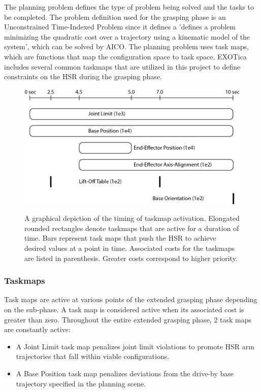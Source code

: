 \documentclass[12pt]{article}
\begin{document}
            \par The planning problem defines the type of problem being solved and the tasks to be completed. The problem definition used for the grasping phase is an Unconstrained Time-Indexed Problem since it defines a 'defines a problem minimizing the quadratic cost over a trajectory using a kinematic model of the system', which can be solved by AICO. The planning problem uses task maps, which are functions that map the configuration space to task space. EXOTica includes several common taskmaps that are utilized in this project to define constraints on the HSR during the grasping phase.
            
            \begin{figure}[ht]
                \centering
                \includegraphics[]{illustrator/taskmap.png}
                \label{fig:taskmap}
                \caption{A graphical depiction of the timing of taskmap activation. Elongated rounded rectangles denote taskmaps that are active for a duration of time. Bars represent task maps that push the HSR to achieve desired values at a point in time. Associated costs for the taskmaps are listed in parenthesis. Greater costs correspond to higher priority.}
            \end{figure}

            \subsubsection{Taskmaps}
                Task maps are active at various points of the extended grasping phase depending on the sub-phase. A task map is considered active when its associated cost is greater than zero. Throughout the entire extended grasping phase, 2 task maps are constantly active:
                \begin{itemize}
                    \item A Joint Limit task map penalizes joint limit violations to promote HSR arm trajectories that fall within viable configurations.

                    \item A Base Position task map penalizes deviations from the drive-by base trajectory specified in the planning scene.
                \end{itemize}
\end{document}
